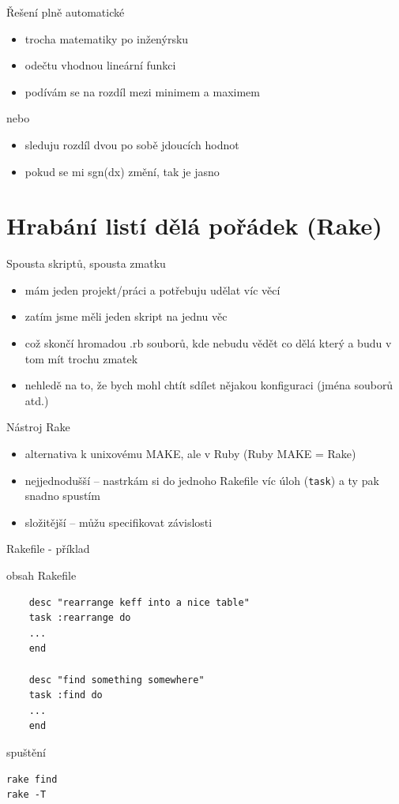 \documentclass{beamer}
\begin{document}
\begin{frame}{Řešení plně automatické}
  \begin{itemize}
    \item trocha matematiky po inženýrsku
    \item odečtu vhodnou lineární funkci
    \item podívám se na rozdíl mezi minimem a maximem
  \end{itemize}
  nebo
  \begin{itemize}
    \item sleduju rozdíl dvou po sobě jdoucích hodnot
    \item pokud se mi sgn(dx) změní, tak je jasno
  \end{itemize}
\end{frame}

\section{Hrabání listí dělá pořádek (Rake)}

\begin{frame}{Spousta skriptů, spousta zmatku}
  \begin{itemize}
    \item mám jeden projekt/práci a potřebuju udělat víc věcí
    \item zatím jsme měli jeden skript na jednu věc
    \item což skončí hromadou .rb souborů, kde nebudu vědět co dělá který a budu v tom mít trochu zmatek
    \item nehledě na to, že bych mohl chtít sdílet nějakou konfiguraci (jména souborů atd.)
  \end{itemize}
\end{frame}

\begin{frame}{Nástroj Rake}
  \begin{itemize}
    \item alternativa k unixovému MAKE, ale v Ruby (Ruby MAKE = Rake)
    \item nejjednodušší -- nastrkám si do jednoho Rakefile víc úloh (\texttt{task}) a ty pak snadno spustím
    \item složitější -- můžu specifikovat závislosti
  \end{itemize}
\end{frame}

\begin{frame}[fragile]{Rakefile - příklad}
  \begin{block}{obsah Rakefile}
        \scriptsize
    \begin{verbatim}
    desc "rearrange keff into a nice table"
    task :rearrange do
    ...
    end

    desc "find something somewhere"
    task :find do
    ...
    end
    \end{verbatim}
  \end{block}
  \begin{block}{spuštění}
        \scriptsize
    \begin{verbatim}
rake find
rake -T
    \end{verbatim}
  \end{block}
\end{frame}
\end{document}
